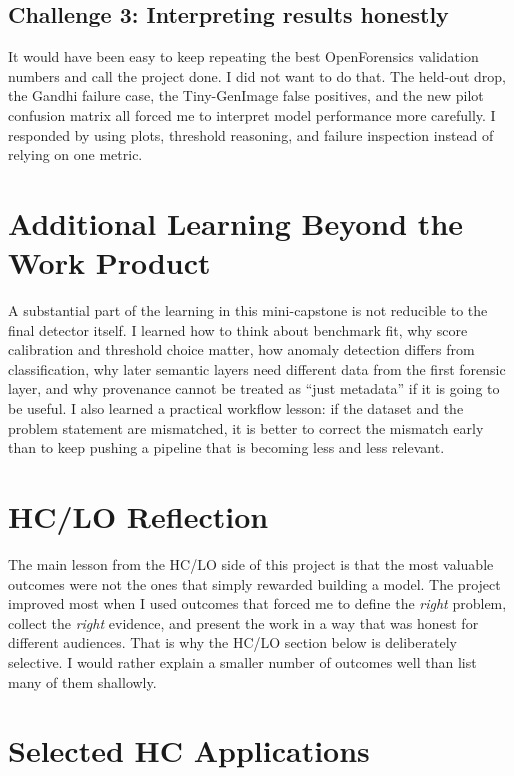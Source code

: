 \documentclass[11pt]{article}
\begin{document}
\subsection{Challenge 3: Interpreting results honestly}
It would have been easy to keep repeating the best OpenForensics validation numbers and call the project done. I did not want to do that. The held-out drop, the Gandhi failure case, the Tiny-GenImage false positives, and the new pilot confusion matrix all forced me to interpret model performance more carefully. I responded by using plots, threshold reasoning, and failure inspection instead of relying on one metric.

\section{Additional Learning Beyond the Work Product}

A substantial part of the learning in this mini-capstone is not reducible to the final detector itself. I learned how to think about benchmark fit, why score calibration and threshold choice matter, how anomaly detection differs from classification, why later semantic layers need different data from the first forensic layer, and why provenance cannot be treated as ``just metadata'' if it is going to be useful. I also learned a practical workflow lesson: if the dataset and the problem statement are mismatched, it is better to correct the mismatch early than to keep pushing a pipeline that is becoming less and less relevant.

\section{HC/LO Reflection}

The main lesson from the HC/LO side of this project is that the most valuable outcomes were not the ones that simply rewarded building a model. The project improved most when I used outcomes that forced me to define the \emph{right} problem, collect the \emph{right} evidence, and present the work in a way that was honest for different audiences. That is why the HC/LO section below is deliberately selective. I would rather explain a smaller number of outcomes well than list many of them shallowly.

\section{Selected HC Applications}
\end{document}
